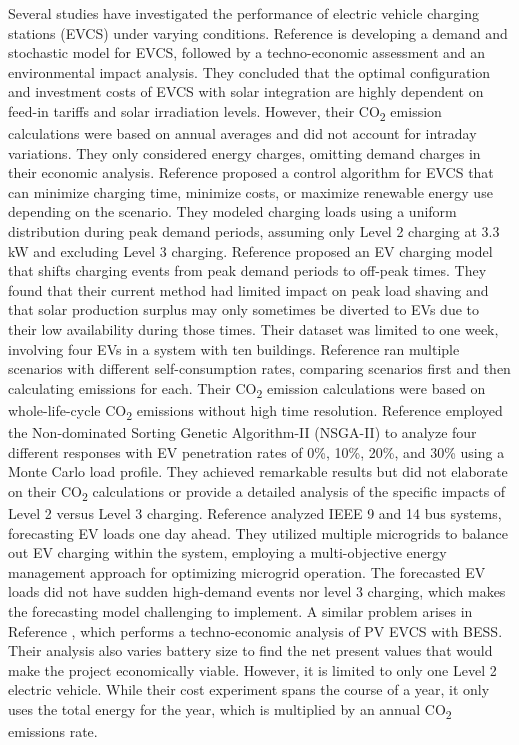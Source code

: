 \documentclass[conference,  usletter]{IEEEtran}
\begin{document}
Several studies have investigated the performance of electric vehicle charging stations (EVCS) under varying conditions. Reference \cite{himabindu2021analysis} is developing a demand and stochastic model for EVCS, followed by a techno-economic assessment and an environmental impact analysis. They concluded that the optimal configuration and investment costs of EVCS with solar integration are highly dependent on feed-in tariffs and solar irradiation levels. However, their CO\textsubscript{2} emission calculations were based on annual averages and did not account for intraday variations. They only considered energy charges, omitting demand charges in their economic analysis. Reference \cite{yoon2017economic} proposed a control algorithm for EVCS that can minimize charging time, minimize costs, or maximize renewable energy use depending on the scenario. They modeled charging loads using a uniform distribution during peak demand periods, assuming only Level 2 charging at 3.3 kW and excluding Level 3 charging. Reference \cite{purvins2018electric} proposed an EV charging model that shifts charging events from peak demand periods to off-peak times. They found that their current method had limited impact on peak load shaving and that solar production surplus may only sometimes be diverted to EVs due to their low availability during those times. Their dataset was limited to one week, involving four EVs in a system with ten buildings. Reference \cite{Khemir} ran multiple scenarios with different self-consumption rates, comparing scenarios first and then calculating emissions for each. Their CO\textsubscript{2} emission calculations were based on whole-life-cycle CO\textsubscript{2} emissions without high time resolution. Reference \cite{huang2023multi} employed the Non-dominated Sorting Genetic Algorithm-II (NSGA-II) to analyze four different responses with EV penetration rates of 0\%, 10\%, 20\%, and 30\% using a Monte Carlo load profile. They achieved remarkable results but did not elaborate on their CO\textsubscript{2} calculations or provide a detailed analysis of the specific impacts of Level 2 versus Level 3 charging. Reference \cite{tan2020multi} analyzed IEEE 9 and 14 bus systems, forecasting EV loads one day ahead. They utilized multiple microgrids to balance out EV charging within the system, employing a multi-objective energy management approach for optimizing microgrid operation. The forecasted EV loads did not have sudden high-demand events nor level 3 charging, which makes the forecasting model challenging to implement. A similar problem arises in Reference \cite{PV_EV_Charging_Station}, which performs a techno-economic analysis of PV EVCS with BESS. Their analysis also varies battery size to find the net present values that would make the project economically viable. However, it is limited to only one Level 2 electric vehicle. While their cost experiment spans the course of a year, it only uses the total energy for the year, which is multiplied by an annual CO\textsubscript{2} emissions rate.
\end{document}

